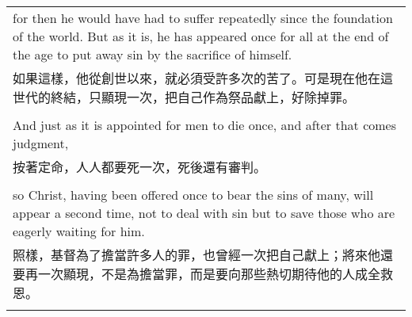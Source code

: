 \documentclass{book}
\begin{document}
\begin{tabularx}{\textwidth}{p{}}
for then he would have had to suffer repeatedly since the foundation of the world. But as it is, he has appeared once for all at the end of the age to put away sin by the sacrifice of himself. \\
如果這樣，他從創世以來，就必須受許多次的苦了。可是現在他在這世代的終結，只顯現一次，把自己作為祭品獻上，好除掉罪。 \\ \\
And just as it is appointed for men to die once, and after that comes judgment, \\
按著定命，人人都要死一次，死後還有審判。 \\ \\
so Christ, having been offered once to bear the sins of many, will appear a second time, not to deal with sin but to save those who are eagerly waiting for him. \\
照樣，基督為了擔當許多人的罪，也曾經一次把自己獻上；將來他還要再一次顯現，不是為擔當罪，而是要向那些熱切期待他的人成全救恩。 \\ \\

\hline
\end{tabularx}

\newpage
\end{document}
